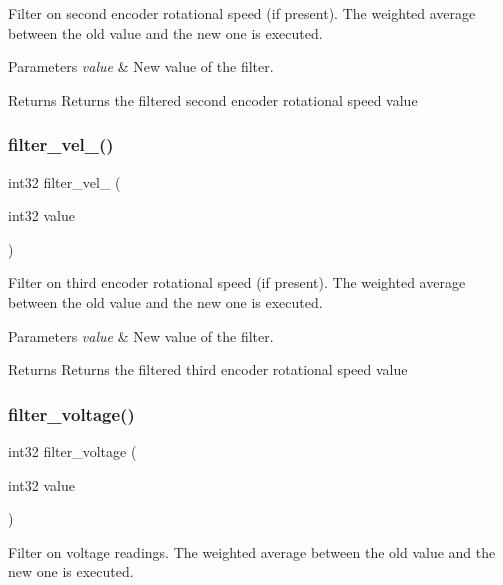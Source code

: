 Filter on second encoder rotational speed (if present). The weighted average between the old value and the new one is executed.


\begin{DoxyParams}{Parameters}
{\em value} & New value of the filter.\\
\hline
\end{DoxyParams}
\begin{DoxyReturn}{Returns}
Returns the filtered second encoder rotational speed value 
\end{DoxyReturn}
\mbox{\label{utils_8c_a44d5627a5b0d37a70edddad83a3362ea}} 
\subsubsection{filter\+\_\+vel\+\_()}
{\footnotesize\ttfamily int32 filter\+\_\+vel\+\_ (\begin{DoxyParamCaption}\item[{int32}]{value }\end{DoxyParamCaption})}

Filter on third encoder rotational speed (if present). The weighted average between the old value and the new one is executed.


\begin{DoxyParams}{Parameters}
{\em value} & New value of the filter.\\
\hline
\end{DoxyParams}
\begin{DoxyReturn}{Returns}
Returns the filtered third encoder rotational speed value 
\end{DoxyReturn}
\mbox{\label{utils_8c_ae34079960d1cb2d36ceb390569507710}} 
\subsubsection{filter\+\_\+voltage()}
{\footnotesize\ttfamily int32 filter\+\_\+voltage (\begin{DoxyParamCaption}\item[{int32}]{value }\end{DoxyParamCaption})}

Filter on voltage readings. The weighted average between the old value and the new one is executed.


